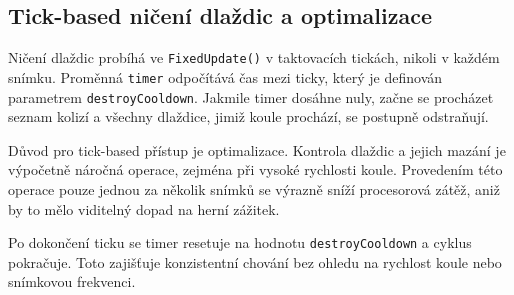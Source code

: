\subsection{Tick-based ničení dlaždic a optimalizace}

Ničení dlaždic probíhá ve \texttt{FixedUpdate()} v taktovacích tickách, nikoli v každém snímku. Proměnná \texttt{timer} odpočítává čas mezi ticky, který je definován parametrem \texttt{destroyCooldown}. Jakmile timer dosáhne nuly, začne se procházet seznam kolizí a všechny dlaždice, jimiž koule prochází, se postupně odstraňují.

Důvod pro tick-based přístup je optimalizace. Kontrola dlaždic a jejich mazání je výpočetně náročná operace, zejména při vysoké rychlosti koule. Provedením této operace pouze jednou za několik snímků se výrazně sníží procesorová zátěž, aniž by to mělo viditelný dopad na herní zážitek.

Po dokončení ticku se timer resetuje na hodnotu \texttt{destroyCooldown} a cyklus pokračuje. Toto zajišťuje konzistentní chování bez ohledu na rychlost koule nebo snímkovou frekvenci.
